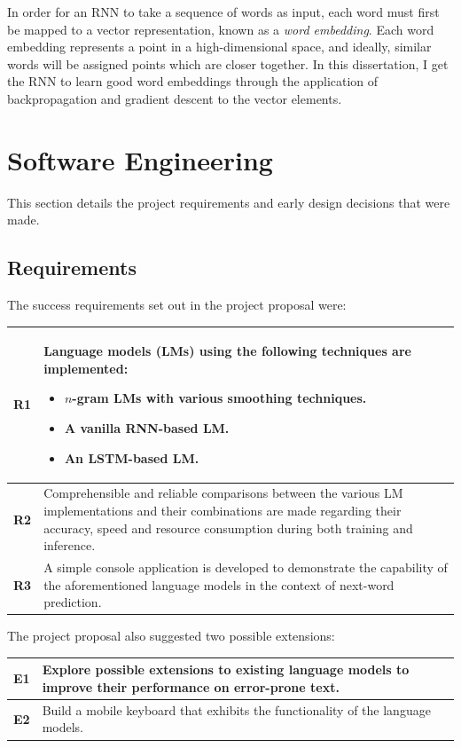 \documentclass[a4paper, 12pt]{report}
\newcommand{\tbf}[1]{\textbf{#1}}
\newcommand{\tit}[1]{\textit{#1}}
\begin{document}
In order for an RNN to take a sequence of words as input, each word must first be mapped to a vector representation, known as a \tit{word embedding}. Each word embedding represents a point in a high-dimensional space, and ideally, similar words will be assigned points which are closer together. In this dissertation, I get the RNN to learn good word embeddings through the application of backpropagation and gradient descent to the vector elements.

\section{Software Engineering}

This section details the project requirements and early design decisions that were made.

\subsection{Requirements}

The success requirements set out in the project proposal were:

\begin{center}
\begin{tabular}{L{1cm} L{14cm}}
	\hline
	\tbf{R1} & Language models (LMs) using the following techniques are implemented:
	\begin{itemize}[nosep]
	\item
		$n$-gram LMs with various smoothing techniques.
	\item
		A vanilla RNN-based LM.
	\item
		An LSTM-based LM.
	\end{itemize}\\[-\normalbaselineskip] \hline
	\tbf{R2} & Comprehensible and reliable comparisons between the various LM implementations and their combinations are made regarding their accuracy, speed and resource consumption during both training and inference. \\ \hline
	\tbf{R3} & A simple console application is developed to demonstrate the capability of the aforementioned language models in the context of next-word prediction. \\ \hline
\end{tabular}
\end{center}

The project proposal also suggested two possible extensions:
\begin{center}
\begin{tabular}{L{1cm} L{14cm}}
	\hline
	\tbf{E1} & Explore possible extensions to existing language models to improve their performance on error-prone text. \\ \hline
	\tbf{E2} & Build a mobile keyboard that exhibits the functionality of the language models. \\ \hline
\end{tabular}
\end{center}
\end{document}
